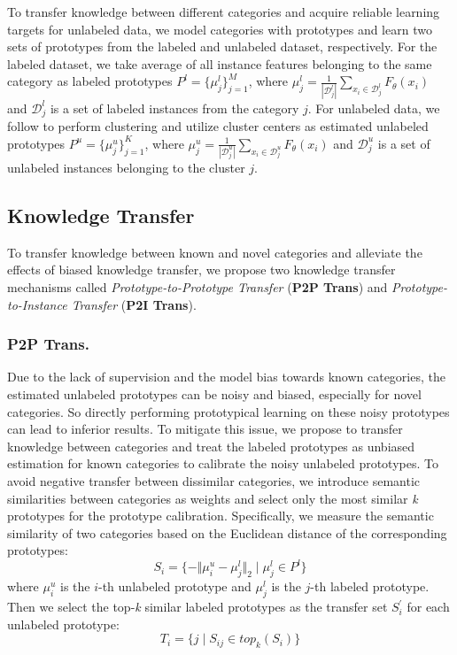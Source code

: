 \documentclass[letterpaper]{article} %
\begin{document}
To transfer knowledge between different categories and acquire reliable learning targets for unlabeled data, we model categories with prototypes \citep{proto} and learn two sets of prototypes from the labeled and unlabeled dataset, respectively.
For the labeled dataset, we take average of all instance features belonging to the same category as labeled prototypes $P^{l} = \{\mu_{j}^{l}\}_{j=1}^{M}$, where $\mu_{j}^{l} = \frac{1}{|\mathcal{D}^{l}_{j}|} \sum_{x_{i} \in \mathcal{D}^{l}_{j}} F_{\theta}(x_{i})$ and $\mathcal{D}^{l}_{j}$ is a set of labeled instances from the category $j$. For unlabeled data, we follow \citet{dpn} to perform clustering and utilize cluster centers as estimated unlabeled prototypes $P^{u} = \{\mu_{j}^{u}\}_{j=1}^{K}$, where $\mu_{j}^{u} = \frac{1}{|\mathcal{D}^{u}_{j}|} \sum_{x_{i} \in \mathcal{D}^{u}_{j}} F_{\theta}(x_{i})$ and $\mathcal{D}^{u}_{j}$ is a set of unlabeled instances belonging to the cluster $j$.


\subsection{Knowledge Transfer}
To transfer knowledge between known and novel categories and alleviate the effects of biased knowledge transfer, we propose two knowledge transfer mechanisms called \textit{Prototype-to-Prototype Transfer} (\textbf{P2P Trans}) and \textit{Prototype-to-Instance Transfer} (\textbf{P2I Trans}).
\subsubsection{P2P Trans.} Due to the lack of supervision and the model bias towards known categories, the estimated unlabeled prototypes can be noisy and biased, especially for novel categories. So directly performing prototypical learning \citep{proto} on these noisy prototypes can lead to inferior results. To mitigate this issue, we propose to transfer knowledge between categories and treat the labeled prototypes as unbiased estimation for known categories to calibrate the noisy unlabeled prototypes. To avoid negative transfer between dissimilar categories, we introduce semantic similarities between categories as weights and select only the most similar \textit{k} prototypes for the prototype calibration. Specifically, we measure the semantic similarity of two categories based on the Euclidean distance of the corresponding prototypes:
\begin{equation}
    S_{i} = \{- \Vert{\mu_{i}^{u} - \mu_{j}^{l}}\Vert_{2} \mid \mu_{j}^{l} \in P^{l} \}
\end{equation}
where $\mu_{i}^{u}$ is the $i$-th unlabeled prototype and $\mu_{j}^{l}$ is the $j$-th labeled prototype. Then we select the top-\textit{k} similar labeled prototypes as the transfer set $S_{i}^{\prime}$ for each unlabeled prototype:
\begin{equation}
    T_{i} = \{ j \mid S_{ij} \in top_{k} (S_{i}) \}
\end{equation}
\end{document}
